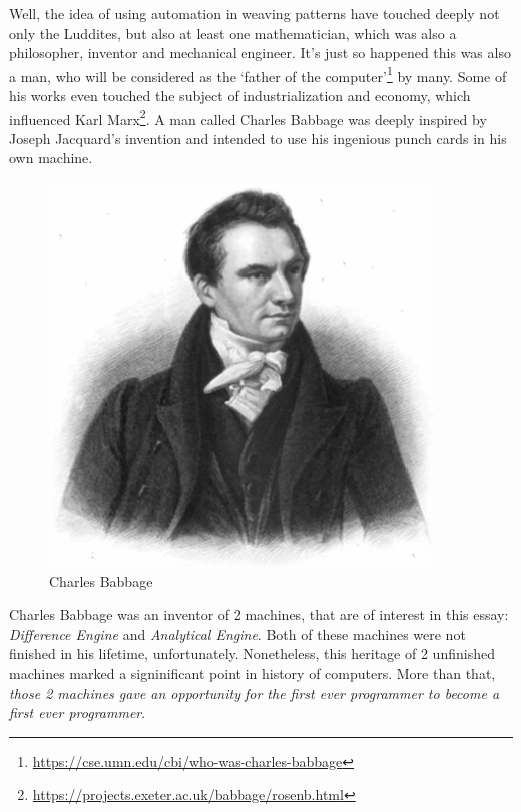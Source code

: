 \documentclass{article}
\begin{document}
            Well, the idea of using automation in weaving patterns have touched deeply not only the Luddites, but also at least one mathematician, which was also a philosopher,
            inventor and mechanical engineer. It's just so happened this was also a man, who will be considered as the `father of the computer'\footnote{\href{https://cse.umn.edu/cbi/who-was-charles-babbage}
            {https://cse.umn.edu/cbi/who-was-charles-babbage}} by many. Some of his works even touched the subject of industrialization and economy, which influenced Karl 
            Marx\footnote{\href{https://projects.exeter.ac.uk/babbage/rosenb.html}{https://projects.exeter.ac.uk/babbage/rosenb.html}}. A man called Charles Babbage was deeply
            inspired by Joseph Jacquard's invention and intended to use his ingenious punch cards in his own machine. \par

            \begin{figure}
                \centering
                \includegraphics[scale=0.3]{images/persons/person_charles_babbage.png}
                \caption{Charles Babbage}
            \end{figure}

            Charles Babbage was an inventor of 2 machines, that are of interest in this essay: \emph{Difference Engine} and \emph{Analytical Engine}. Both of these machines
            were not finished in his lifetime, unfortunately. Nonetheless, this heritage of 2 unfinished machines marked a signinificant point in history of computers. More 
            than that, \emph{those 2 machines gave an opportunity for the first ever programmer to become a first ever programmer}. \par
\end{document}
